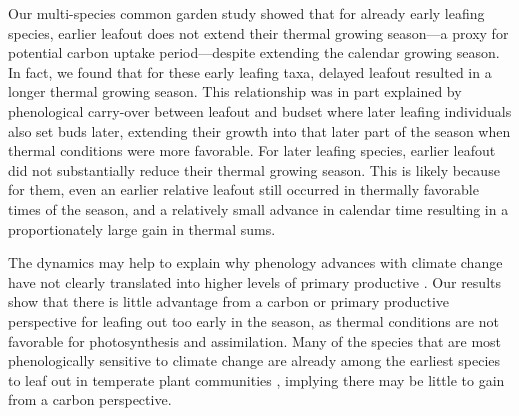 \documentclass[12 pt]{article}
\begin{document}
Our multi-species common garden study showed that for already early leafing species, earlier leafout does not extend their thermal growing season---a proxy for potential carbon uptake period---despite extending the calendar growing season. In fact, we found that for these early leafing taxa, delayed leafout resulted in a longer thermal growing season. This relationship was in part explained by phenological carry-over between leafout and budset where later leafing individuals also set buds later, extending their growth into that later part of the season when thermal conditions were more favorable.  For later leafing species, earlier leafout did not substantially reduce their thermal growing season. This is likely because for them, even an earlier relative leafout still occurred in thermally favorable times of the season, and a relatively small advance in calendar time resulting in a proportionately large gain in thermal sums.

The dynamics may help to explain why phenology advances with climate change have not clearly translated into higher levels of primary productive \citep{}. Our results show that there is little advantage from a carbon or primary productive perspective for leafing out too early in the season, as thermal conditions are not favorable for photosynthesis and assimilation. Many of the species that are most phenologically sensitive to climate change are already among the earliest species to leaf out in temperate plant communities \citep{}, implying there may be little to gain from a carbon perspective.
\end{document}
